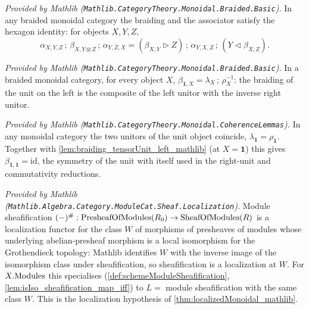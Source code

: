 \begin{lemma}
  \label{lem:braided_hexagon_mathlib}
  \mathlibok
  \textit{Provided by Mathlib
  (\texttt{Mathlib.CategoryTheory.Monoidal.Braided.Basic}).}
  In any braided monoidal category the braiding and the associator satisfy the
  hexagon identity: for objects \(X, Y, Z\),
  \[
    \alpha_{X,Y,Z} \,;\, \beta_{X, Y \otimes Z} \,;\, \alpha_{Y,Z,X}
      = (\beta_{X,Y} \rhd Z) \,;\, \alpha_{Y,X,Z}
        \,;\, (Y \lhd \beta_{X,Z}).
  \]
\end{lemma}

\begin{lemma}
  \label{lem:braiding_tensorUnit_left_mathlib}
  \mathlibok
  \textit{Provided by Mathlib
  (\texttt{Mathlib.CategoryTheory.Monoidal.Braided.Basic}).}
  In a braided monoidal category, for every object \(X\),
  \(\beta_{\mathbf{1}, X} = \lambda_X \,;\, \rho_X^{-1}\): the braiding of the unit
  on the left is the composite of the left unitor with the inverse right unitor.
\end{lemma}

\begin{lemma}
  \label{lem:unitors_equal_mathlib}
  \mathlibok
  \textit{Provided by Mathlib
  (\texttt{Mathlib.CategoryTheory.Monoidal.CoherenceLemmas}).}
  In any monoidal category the two unitors of the unit object coincide,
  \(\lambda_{\mathbf{1}} = \rho_{\mathbf{1}}\). Together with
  \cref{lem:braiding_tensorUnit_left_mathlib} (at \(X = \mathbf{1}\)) this gives
  \(\beta_{\mathbf{1},\mathbf{1}} = \mathrm{id}\), the symmetry of the unit with
  itself used in the right-unit and commutativity reductions.
\end{lemma}

\begin{lemma}
  \label{lem:sheafification_isLocalization_mathlib}
  \mathlibok
  \textit{Provided by Mathlib
  (\texttt{Mathlib.Algebra.Category.ModuleCat.Sheaf.Localization}).}
  Module sheafification \((-)^{\#} : \mathrm{PresheafOfModules}(R_0) \to \mathrm{SheafOfModules}(R)\) is a
  localization functor for the class \(W\) of morphisms of presheaves of modules
  whose underlying abelian-presheaf morphism is a local isomorphism for the
  Grothendieck topology: Mathlib identifies \(W\) with the inverse image of the
  isomorphism class under sheafification, so sheafification is a localization at
  \(W\). For \(X.\mathrm{Modules}\) this specialises (\cref{def:schemeModuleSheafification},
  \cref{lem:isIso_sheafification_map_iff}) to \(L = \) module sheafification with
  the same class \(W\). This is the localization hypothesis of
  \cref{thm:localizedMonoidal_mathlib}.
\end{lemma}

